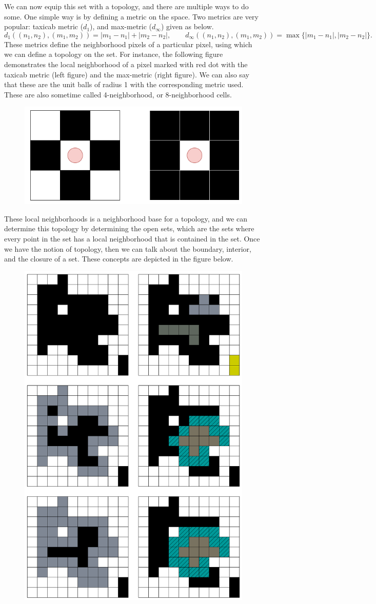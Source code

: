 \documentclass[11pt,a4paper]{article}
\newcommand{\set}[1]{\{#1\}}
\newcommand{\abs}[1]{|#1|}
\theoremstyle{definition}
\theoremstyle{remark}
\begin{document}
	We can now equip this set with a topology, and there are multiple ways to do some. One simple way is by defining a metric on the space. Two metrics are very popular: taxicab metric ($ d_1 $), and max-metric ($ d_\infty $) given as below.
	\[ d_1((n_1,n_2),(m_1,m_2)) = \abs{m_1-n_1} + \abs{m_2-n_2}, \qquad d_\infty((n_1,n_2),(m_1,m_2))=\max\set{\abs{m_1-n_1},\abs{m_2-n_2}}. \]
	These metrics define the neighborhood pixels of a particular pixel, using which we can define a topology on the set. For instance, the following figure demonstrates the local neighborhood of a pixel marked with red dot with the taxicab metric (left figure) and the max-metric (right figure). We can also say that these are the unit balls of radius 1 with the corresponding metric used. These are also sometime called 4-neighborhood, or 8-neighborhood cells.
	\begin{figure}[h!]
		\centering
		\includegraphics[width=0.5\linewidth]{images/NeighborhoodMetric}
		\label{fig:neighborhoodmetric}
	\end{figure}
	\FloatBarrier
	
	These local neighborhoods is a neighborhood base for a topology, and we can determine this topology by determining the open sets, which are the sets where every point in the set has a local neighborhood that is contained in the set. Once we have the notion of topology, then we can talk about the boundary, interior, and the closure of a set. These concepts are depicted in the figure below.
	
	\begin{figure}[h!]
		\centering
		\includegraphics[width=0.6\linewidth]{images/openAndClosedSets}
		\label{fig:openandclosedsets}
	\end{figure}
	\FloatBarrier
	
\end{document}
